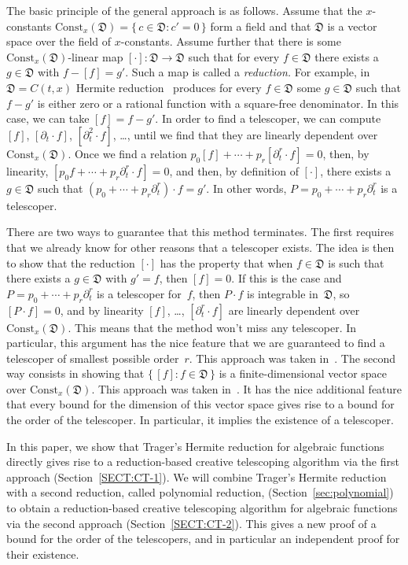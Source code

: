 \documentclass{sig-alternate}
\begin{document}
The basic principle of the general approach is as follows. Assume that the
$x$-constants $\mathrm{Const}_x(\mathfrak{D})=\{\,c\in \mathfrak{D}:c'=0\,\}$ form a field and that $\mathfrak{D}$
is a vector space over the field of $x$-constants. Assume further that there is
some $\mathrm{Const}_x(\mathfrak{D})$-linear map $[\cdot]\colon \mathfrak{D}\to \mathfrak{D}$ such that for every
$f\in \mathfrak{D}$ there exists a $g\in \mathfrak{D}$ with $f-[f]=g'$. Such a map is called a
\emph{reduction.} For example, in $\mathfrak{D}=C(t,x)$ Hermite reduction~\cite{Hermite1872} produces for
every $f\in \mathfrak{D}$ some $g\in \mathfrak{D}$ such that $f-g'$ is either zero or a rational function
with a square-free denominator. In this case, we can take $[f]=f-g'$.
In order to find a telescoper, we can compute $[f]$, $[\partial_t\cdot f]$, $[\partial_t^2\cdot f]$, \dots,
until we find that they are linearly dependent over $\mathrm{Const}_x(\mathfrak{D})$.
Once we find a relation
$p_0[f] + \cdots + p_r[\partial_t^r\cdot f] = 0$,
then, by linearity,
$[p_0 f + \cdots + p_r \partial_t^r\cdot f] = 0$,
and then, by definition of $[\cdot]$, there exists a $g\in\mathfrak{D}$ such that $(p_0+\cdots + p_r\partial_t^r)\cdot f=g'$.
In other words, $P=p_0+\cdots + p_r\partial_t^r$ is a telescoper.

There are two ways to guarantee that this method terminates. The first requires that we already know for
other reasons that a telescoper exists. The idea is then to show that the
reduction $[\cdot]$ has the property that when $f\in \mathfrak{D}$ is such that there
exists a $g\in \mathfrak{D}$ with $g'=f$, then $[f]=0$. If this is the case and
$P=p_0+\cdots+p_r\partial_t^r$ is a telescoper for~$f$, then $P\cdot f$ is integrable
in~$\mathfrak{D}$, so $[P\cdot f]=0$, and by linearity $[f]$, \dots, $[\partial_t^r\cdot f]$ are
linearly dependent over $\mathrm{Const}_x(\mathfrak{D})$. This means that the method won't
miss any telescoper. In particular, this argument has the nice feature that we
are guaranteed to find a telescoper of smallest possible order~$r$. This
approach was taken in~\cite{chen15a}.
The second way consists in showing that $\{\,[f]:f\in \mathfrak{D}\,\}$ is a finite-dimensional vector space over
$\mathrm{Const}_x(\mathfrak{D})$. This approach was taken in~\cite{BCCL2010,bostan13a}. It has the
nice additional feature that every bound for the dimension of this vector space
gives rise to a bound for the order of the telescoper. In particular, it implies
the existence of a telescoper.

In this paper, we show that Trager's Hermite reduction for algebraic
functions directly gives rise to a reduction-based creative telescoping
algorithm via the first approach (Section~\ref{SECT:CT-1}). We will combine Trager's Hermite reduction
with a second reduction, called polynomial reduction, (Section~\ref{sec:polynomial}) to obtain a reduction-based creative
telescoping algorithm for algebraic functions via the second approach (Section~\ref{SECT:CT-2}).
This gives a new proof of a bound for the order of the telescopers, and in
particular an independent proof for their existence.
\end{document}
